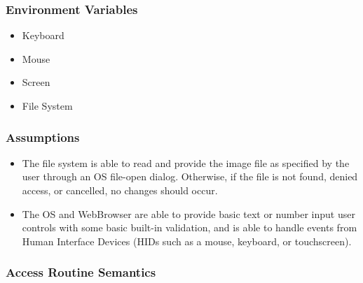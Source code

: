 \documentclass[12pt, titlepage]{article}
\begin{document}
\subsubsection{Environment Variables}
\begin{itemize}
  \item Keyboard
  \item Mouse
  \item Screen
  \item File System
\end{itemize}

\subsubsection{Assumptions}
\begin{itemize}
  \item The file system is able to read and provide the image file as specified by the user through an OS file-open dialog.
  Otherwise, if the file is not found, denied access, or cancelled, no changes should occur.
  \item The OS and WebBrowser are able to provide basic text or number input user controls with some basic built-in validation,
  and is able to handle events from Human Interface Devices (HIDs such as a mouse, keyboard, or touchscreen).
\end{itemize}

\subsubsection{Access Routine Semantics}
\end{document}
